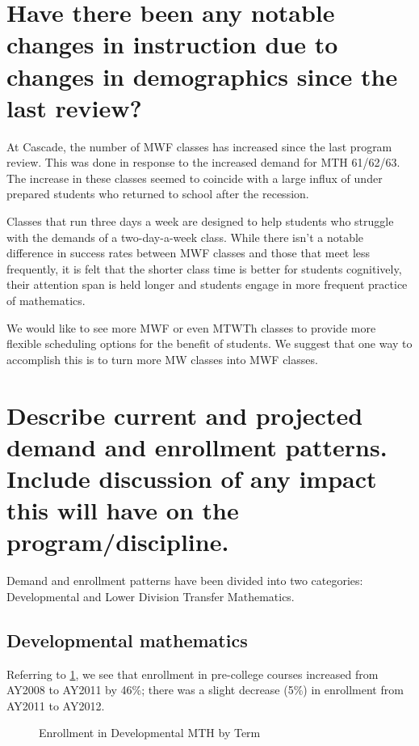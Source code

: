 \section[Changes in instruction due to changes in demographics]{Have there been any notable changes in instruction due to changes in
demographics since the last review?}
At Cascade, the number of MWF classes has increased since the last program
review. This was done in response to the increased demand for MTH 61/62/63. The
increase in these classes seemed to coincide with a large influx of
under prepared students who returned to school after the recession.

Classes that run three days a week are designed to help students who struggle
with the demands of a two-day-a-week class.  While there isn't a notable
difference in success rates between MWF classes and those that meet less
frequently, it is felt that the shorter class time is better for students
cognitively, their attention span is held longer and students engage in more
frequent practice of mathematics.

We would like to see more MWF or even MTWTh classes to provide more flexible
scheduling options for the benefit of students. We suggest that one way to
accomplish this is to turn more MW classes into MWF classes.

\section[Demand and enrollment patterns]{Describe current and projected demand and enrollment patterns.
 Include discussion of any impact this will have on the program/discipline.
}
Demand and enrollment patterns have been divided into two categories:
Developmental and Lower Division Transfer Mathematics.

\subsection{Developmental mathematics}
Referring to \cref{needs:fig:enrollmentDevelopTerm}, we see that
enrollment in pre-college courses increased from AY2008 to AY2011 by 46\%;
there was a slight decrease (5\%) in enrollment from AY2011 to AY2012.

\begin{figure}[!htb]
	\centering
	
	\caption{Enrollment in Developmental MTH by Term}
	\label{needs:fig:enrollmentDevelopTerm}
\end{figure}

